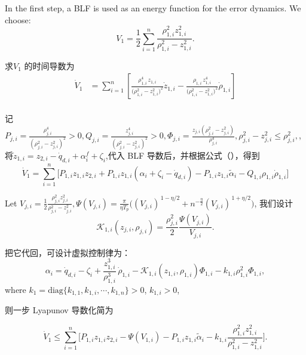 \documentclass[pdflatex,sn-mathphys-num]{sn-jnl}%
\theoremstyle{thmstyleone}%
\theoremstyle{thmstyletwo}%
\theoremstyle{thmstylethree}%
\begin{document}
In the first step, a BLF is used as an energy function for the error dynamics. We choose:
\begin{equation}\label{eq:25}
	V_1= \frac{1}{2}\sum_{i=1}^{n} \frac{\rho_{1,i}^2 z_{1,i}^2}{\rho_{1,i}^2-z_{1,i}^2}. 
\end{equation}

求$V_1$ 的时间导数为
\begin{equation}\label{eq:25}
	\begin{aligned}
\dot V_1
&=\sum_{i=1}^{n}\left[
\frac{\rho_{1,i}^4\,z_{1,i}}{\big(\rho_{1,i}^{2}-z_{1,i}^{2}\big)^{2}}\dot z_{1,i}
-
\frac{\rho_{1,i}\,z_{1,i}^{4}}{\big(\rho_{1,i}^{2}-z_{1,i}^{2}\big)^{2}}\dot \rho_{1,i}
\right]\\
\end{aligned}
\end{equation}

记
$
P_{j,i}=\frac{\rho_{j,i}^4}{(\rho_{j,i}^2-z_{j,i}^2)^2}>0,
Q_{j,i}=\frac{ z_{j,i}^4}{(\rho_{j,i}^2-z_{j,i}^2)^2}>0,
\Phi_{j,i}=\frac{z_{j,i}\left(\rho_{j,i}^{2}-z_{j,i}^{2}\right)}{\rho_{j,i}^{4}}, \rho_{j,i}^2 - z_{j,i}^2 \le \rho_{j,i}^2,
$, 将$\dot z_{1,i}= z_{2,i}-\dot q_{d,i}+\alpha^{f}_i+\zeta_i$,代入 BLF 导数后，并根据公式（），得到
$$
\dot V_1=\sum_{i=1}^n\!\Big[P_{1,i} z_{1,i}z_{2,i}+P_{1,i}z_{1,i}(\alpha_i+\zeta_i-\dot q_{d,i})-P_{1,i}z_{1,i}\tilde\alpha_i-Q_{1,i}\rho_{1,i} \dot\rho_{1,i}\Big]
$$

Let ${V_{j,i}}=\frac{1}{2}\frac{\rho_{j,i}^2 z_{j,i}^2}{\rho_{j,i}^2-z_{j,i}^2}, \Psi(V_{j,i})=\frac{\pi}{ \eta T_p}\Big((V_{j,i})^{\,1-\eta/2}+n^{-\frac{\eta}{2} }(V_{j,i})^{\,1+\eta/2}\Big)$, 我们设计
$$
\mathcal{K}_{1,i}(z_{j,i},\rho_{j,i})
=\frac{\rho_{j,i}^2}{2}\frac{\Psi(V_{j,i})}{V_{j,i}}.
$$

把它代回，可设计虚拟控制律为：
\begin{equation}\label{eq:25}
\alpha_i = \dot q_{d,i}-\zeta_i+\frac{z_{1,i}^3}{\rho_{1,i}^3}\,\dot\rho_{1,i}
-\mathcal{K}_{1,i}(z_{1,i},\rho_{1,i})\Phi_{1,i}
-k_{1,i} \rho_{1,i}^2 \Phi_{1,i},
\end{equation}
where $k_1=\mathrm{diag}\{k_{1,1},k_{1,i},\cdots,k_{1,n}\}>0$, $k_{1,i}>0$,

则一步 Lyapunov 导数化简为

$$
\dot V_1
\le \sum_{i=1}^n \Big[ P_{1,i}z_{1,i} z_{2,i}
-\Psi(V_{1,i})-P_{1,i}z_{1,i}\tilde\alpha_i- k_{1,i}\frac{\rho_{1,i}^2 z_{1,i}^2}{\rho_{1,i}^2-z_{1,i}^2} 
\Big].
$$
\end{document}
